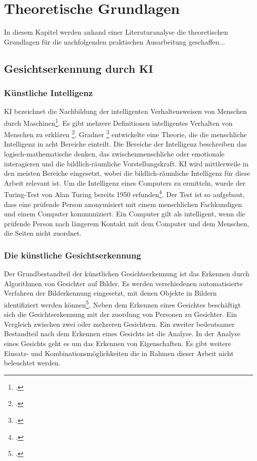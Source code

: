 \newpage
\section{Theoretische Grundlagen} \label{theorie}
In diesem Kapitel werden anhand einer Literaturanalyse die theoretischen Grundlagen für die nachfolgenden praktischen Ausarbeitung geschaffen...


\subsection{Gesichtserkennung durch KI}

\subsubsection{Künstliche Intelligenz}
\acf*{KI} bezeichnet die Nachbildung der intelligenten Verhaltensweisen von Menschen durch Maschinen\footcite[Vgl. ][]{copeland_artificial_2022}. Es gibt mehrere Definitionen intelligentes Verhalten von Menschen zu erklären \footcite[Vgl. ][]{paas_kunstliche_2020}. Gradner \footcite[Vgl. ][]{gardner_frames_1984} entwickelte eine Theorie, die die menschliche Intelligenz in acht Bereiche einteilt. Die Bereiche der Intelligenz beschreiben \zb das logisch-mathematische denken, das zwischenmenschliche oder emotionale interagieren und die bildlich-räumliche Vorstellungskraft. \ac{KI} wird mittlerweile in den meisten Bereiche eingesetzt, wobei die bildlich-räumliche Intelligenz für diese Arbeit relevant ist. Um die Intelligenz eines Computers zu ermitteln, wurde der Turing-Test von Alan Turing bereits 1950 erfunden\footcite[Vgl. ][]{moor_turing_2003}. Der Test ist so aufgebaut, dass eine prüfende Person anonymisiert mit einem menschlichen Fachkundigen und einem Computer kommuniziert. Ein Computer gilt als intelligent, wenn die prüfende Person nach längerem Kontakt mit dem Computer und dem Menschen, die Seiten nicht zuordnet. %


\subsubsection{Die künstliche Gesichtserkennung} 
Der Grundbestandteil der künstlichen Gesichtserkennung ist das Erkennen durch Algorithmen von Gesichter auf Bilder. Es werden verschiedenen automatisierte Verfahren der Bilderkennung eingesetzt, mit denen Objekte in Bildern identifiziert werden können\footcite[Vgl. ][Seite 119]{paas_kunstliche_2020}. Neben dem Erkennen eines Gesichtes beschäftigt sich die Gesichtserkennung mit der zuordung von Personen zu Gesichter. Ein Vergleich zwischen zwei oder mehreren Gesichtern. Ein zweiter bedeutsamer Bestandteil nach dem Erkennen eines Gesichts ist die Analyse. In der Analyse eines Gesichts geht es um das Erkennen von Eigenschaften. Es gibt weitere Einsatz- und Kombinationsmöglichkeiten die in Rahmen dieser Arbeit nicht beleuchtet werden. 


